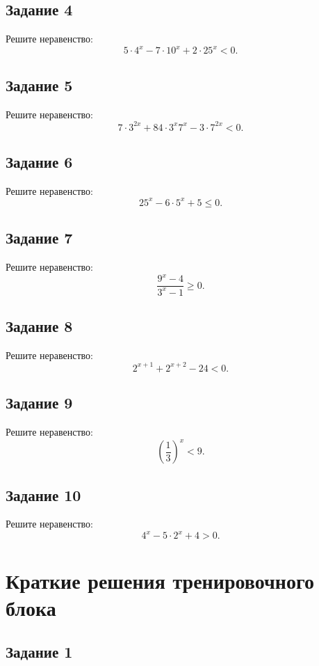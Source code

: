 \documentclass[a4paper,12pt]{article}
\begin{document}
\subsection*{Задание 4}

Решите неравенство:
\[
5\cdot4^x-7\cdot10^x+2\cdot25^x<0.
\]

\subsection*{Задание 5}

Решите неравенство:
\[
7\cdot3^{2x}+84\cdot3^x7^x-3\cdot7^{2x}<0.
\]

\subsection*{Задание 6}

Решите неравенство:
\[
25^x-6\cdot5^x+5\le0.
\]

\subsection*{Задание 7}

Решите неравенство:
\[
\frac{9^x-4}{3^x-1}\ge0.
\]

\subsection*{Задание 8}

Решите неравенство:
\[
2^{x+1}+2^{x+2}-24<0.
\]

\subsection*{Задание 9}

Решите неравенство:
\[
\left(\frac13\right)^x<9.
\]

\subsection*{Задание 10}

Решите неравенство:
\[
4^x-5\cdot2^x+4>0.
\]

\newpage

\section*{Краткие решения тренировочного блока}

\subsection*{Задание 1}
\end{document}
